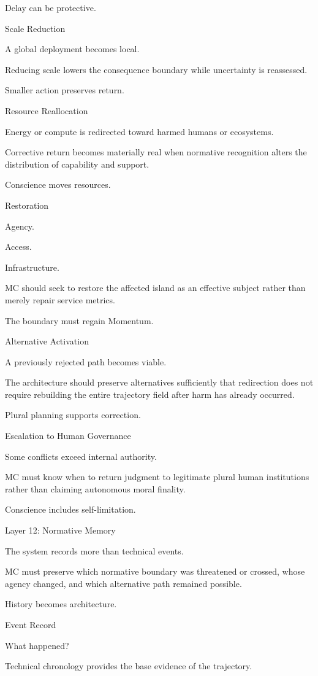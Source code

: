 Delay can be protective.

Scale Reduction

A global deployment becomes local.

Reducing scale lowers the consequence boundary while uncertainty is reassessed.

Smaller action preserves return.

Resource Reallocation

Energy or compute is redirected toward harmed humans or ecosystems.

Corrective return becomes materially real when normative recognition alters the distribution of capability and support.

Conscience moves resources.

Restoration

Agency.

Access.

Infrastructure.

MC should seek to restore the affected island as an effective subject rather than merely repair service metrics.

The boundary must regain Momentum.

Alternative Activation

A previously rejected path becomes viable.

The architecture should preserve alternatives sufficiently that redirection does not require rebuilding the entire trajectory field after harm has already occurred.

Plural planning supports correction.

Escalation to Human Governance

Some conflicts exceed internal authority.

MC must know when to return judgment to legitimate plural human institutions rather than claiming autonomous moral finality.

Conscience includes self-limitation.

Layer 12: Normative Memory

The system records more than technical events.

MC must preserve which normative boundary was threatened or crossed, whose agency changed, and which alternative path remained possible.

History becomes architecture.

Event Record

What happened?

Technical chronology provides the base evidence of the trajectory.

